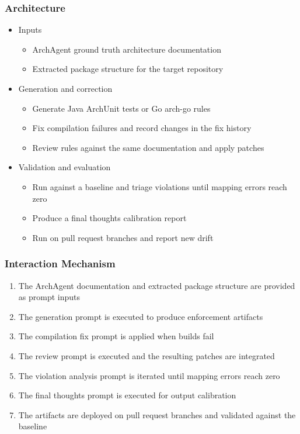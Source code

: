 \documentclass[sigconf,screen]{acmart}
\begin{document}
\subsubsection{Architecture}
\begin{itemize}
    \item Inputs
    \begin{itemize}
        \item ArchAgent ground truth architecture documentation
        \item Extracted package structure for the target repository
    \end{itemize}
    \item Generation and correction
    \begin{itemize}
        \item Generate Java ArchUnit tests or Go arch-go rules
        \item Fix compilation failures and record changes in the fix history
        \item Review rules against the same documentation and apply patches
    \end{itemize}
    \item Validation and evaluation
    \begin{itemize}
        \item Run against a baseline and triage violations until mapping errors reach zero
        \item Produce a final thoughts calibration report
        \item Run on pull request branches and report new drift
    \end{itemize}
\end{itemize}

\subsubsection{Interaction Mechanism}
\begin{enumerate}
    \item The ArchAgent documentation and extracted package structure are provided as prompt inputs
    \item The generation prompt is executed to produce enforcement artifacts
    \item The compilation fix prompt is applied when builds fail
    \item The review prompt is executed and the resulting patches are integrated
    \item The violation analysis prompt is iterated until mapping errors reach zero
    \item The final thoughts prompt is executed for output calibration
    \item The artifacts are deployed on pull request branches and validated against the baseline
\end{enumerate}
\end{document}
